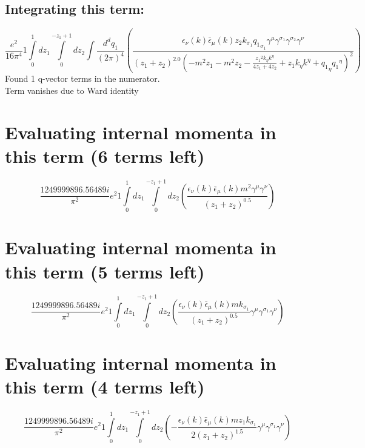 \subsection*{Integrating this term:}
\begin{dmath}\frac{e^{2}}{16 \pi^{4}}1\int\limits_{ 0 }^{ 1 } d{ z_{ 1 } }\int\limits_{ 0 }^{ - { z_{ 1 } } + 1 } d{ z_{ 2 } }\int\frac{d^d q_1 }{ (2\pi)^4 }\left(\frac{\epsilon_{ \nu }({ k }) \bar{\epsilon}_{ \mu }({ k }) { z_{ 2 } } { { k }_{ \sigma_1 } } { { q_1 }_{ \sigma_1 } } { \gamma^{ \mu } } { \gamma^{ \sigma_1 } } { \gamma^{ \sigma_2 } } { \gamma^{ \nu } }}{\left({ z_{ 1 } } + { z_{ 2 } }\right)^{2.0} \left(- m^{2} { z_{ 1 } } - m^{2} { z_{ 2 } } - \frac{{ z_{ 1 } }^{2} { { k }_{ \eta } } { { k }^{ \eta } }}{4 { z_{ 1 } } + 4 { z_{ 2 } }} + { z_{ 1 } } { { k }_{ \eta } } { { k }^{ \eta } } + { { q_1 }_{ \eta } } { { q_1 }^{ \eta } }\right)^{2}}\right)\end{dmath}
Found 1 q-vector terms in the numerator.\\
Term vanishes due to Ward identity\\
\section*{Evaluating internal momenta in this term (6 terms left)}
\begin{dmath}\frac{1249999896.56489 i}{\pi^{2}} e^{2}1\int\limits_{ 0 }^{ 1 } d{ z_{ 1 } }\int\limits_{ 0 }^{ - { z_{ 1 } } + 1 } d{ z_{ 2 } }\left(\frac{\epsilon_{ \nu }({ k }) \bar{\epsilon}_{ \mu }({ k }) m^{2} { \gamma^{ \mu } } { \gamma^{ \nu } }}{\left({ z_{ 1 } } + { z_{ 2 } }\right)^{0.5}}\right)\end{dmath}
\section*{Evaluating internal momenta in this term (5 terms left)}
\begin{dmath}\frac{1249999896.56489 i}{\pi^{2}} e^{2}1\int\limits_{ 0 }^{ 1 } d{ z_{ 1 } }\int\limits_{ 0 }^{ - { z_{ 1 } } + 1 } d{ z_{ 2 } }\left(\frac{\epsilon_{ \nu }({ k }) \bar{\epsilon}_{ \mu }({ k }) m { { k }_{ \sigma_1 } }}{\left({ z_{ 1 } } + { z_{ 2 } }\right)^{0.5}} { \gamma^{ \mu } } { \gamma^{ \sigma_1 } } { \gamma^{ \nu } }\right)\end{dmath}
\section*{Evaluating internal momenta in this term (4 terms left)}
\begin{dmath}\frac{1249999896.56489 i}{\pi^{2}} e^{2}1\int\limits_{ 0 }^{ 1 } d{ z_{ 1 } }\int\limits_{ 0 }^{ - { z_{ 1 } } + 1 } d{ z_{ 2 } }\left(- \frac{\epsilon_{ \nu }({ k }) \bar{\epsilon}_{ \mu }({ k }) m { z_{ 1 } } { { k }_{ \sigma_1 } }}{2 \left({ z_{ 1 } } + { z_{ 2 } }\right)^{1.5}} { \gamma^{ \mu } } { \gamma^{ \sigma_1 } } { \gamma^{ \nu } }\right)\end{dmath}
